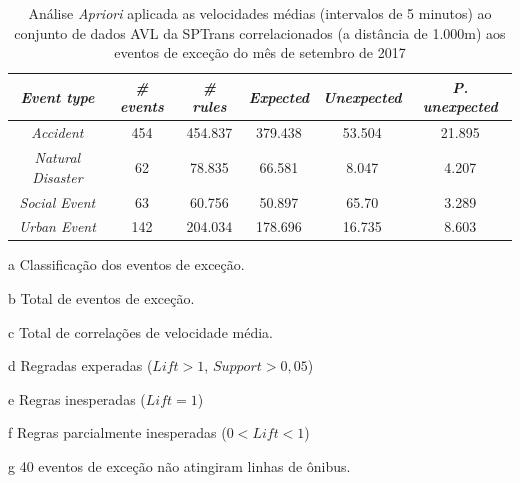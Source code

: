 \documentclass[
	12pt,				%
	oneside,			%
	a4paper,			%
	english,			%
	brazil				%
	]{abntex2ppgsi}
\begin{document}
\begin{apendicesenv}
\begin{table}[!htb]
\centering
\begin{threeparttable}
\caption {Análise \textit{Apriori} aplicada as velocidades médias (intervalos de 5 minutos) ao conjunto de dados AVL da SPTrans correlacionados (a distância de 1.000m) aos eventos de exceção do mês de setembro de 2017}
\label {tab:aprioriFull}
\begin{tabular}{c|c|c|c|c|c}
\hline
\textbf{\textit{Event type}}\tnote{a} & \textbf{\textit{\# events}}\tnote{b} & \textit{\textbf{\# rules}}\tnote{c} & \textbf{\textit{Expected}}\tnote{d} & \textbf{\textit{Unexpected}}\tnote{e} & \textbf{\textit{P. unexpected}}\tnote{f}   \\
\hline
\textit{Accident} & 454 & 454.837 & 379.438 & 53.504 & 21.895 \\
\textit{Natural Disaster} & 62 & 78.835 & 66.581 & 8.047 & 4.207 \\
\textit{Social Event} & 63 & 60.756 & 50.897 & 65.70 & 3.289 \\
\textit{Urban Event} & 142 & 204.034 & 178.696 & 16.735 & 8.603 \\
\hline
\end{tabular}
\begin{tablenotes}
            \item[a] Classificação dos eventos de exceção.
            \item[b] Total de eventos de exceção.
            \item[c] Total de correlações de velocidade média.
            \item[d] Regradas experadas ($Lift > 1$, $Support > 0,05$)
            \item[e] Regras inesperadas ($Lift = 1$)
            \item[f] Regras parcialmente inesperadas ($0 < Lift < 1$)
            \item[g] 40 eventos de exceção não atingiram linhas de ônibus.
        \end{tablenotes}
\end{threeparttable}
\end{table}


\end{apendicesenv}
\end{document}
